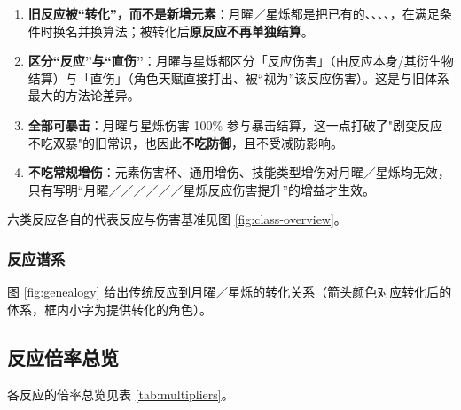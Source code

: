 \begin{enumerate}
\item \textbf{旧反应被“转化”，而不是新增元素}：月曜／星烁都是把已有的、、、、，在满足条件时换名并换算法；被转化后\textbf{原反应不再单独结算}。
\item \textbf{区分“反应”与“直伤”}：月曜与星烁都区分「反应伤害」（由反应本身/其衍生物结算）与「直伤」（角色天赋直接打出、被“视为”该反应伤害）。这是与旧体系最大的方法论差异。
\item \textbf{全部可暴击}：月曜与星烁伤害 100\% 参与暴击结算，这一点打破了"剧变反应不吃双暴"的旧常识，也因此\textbf{不吃防御}，且不受减防影响。
\item \textbf{不吃常规增伤}：元素伤害杯、通用增伤、技能类型增伤对月曜／星烁均无效，只有写明“月曜／／／／／／星烁反应伤害提升”的增益才生效。
\end{enumerate}

六类反应各自的代表反应与伤害基准见图 \ref{fig:class-overview}。

\figClassOverview

\subsubsection{反应谱系}

图 \ref{fig:genealogy} 给出传统反应到月曜／星烁的转化关系（箭头颜色对应转化后的体系，框内小字为提供转化的角色）。

\figGenealogy

\subsection{反应倍率总览}

各反应的倍率总览见表 \ref{tab:multipliers}。

